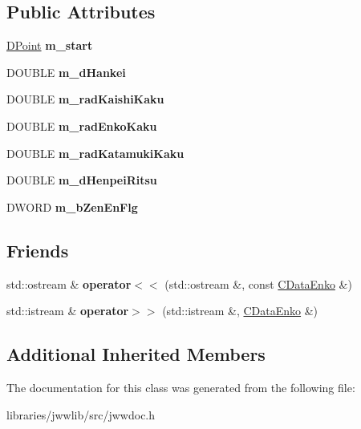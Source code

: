 \subsection*{Public Attributes}
\begin{DoxyCompactItemize}
\item 
\hypertarget{classCDataEnko_a9d4d16cc891a21c283fbfbe2a4830b1d}{\hyperlink{struct__DPoint}{D\-Point} {\bfseries m\-\_\-start}}\label{classCDataEnko_a9d4d16cc891a21c283fbfbe2a4830b1d}

\item 
\hypertarget{classCDataEnko_a9462f5d6a7f3be5f10230015dee146d6}{D\-O\-U\-B\-L\-E {\bfseries m\-\_\-d\-Hankei}}\label{classCDataEnko_a9462f5d6a7f3be5f10230015dee146d6}

\item 
\hypertarget{classCDataEnko_a2ab6fccfb035620f617380ee76594641}{D\-O\-U\-B\-L\-E {\bfseries m\-\_\-rad\-Kaishi\-Kaku}}\label{classCDataEnko_a2ab6fccfb035620f617380ee76594641}

\item 
\hypertarget{classCDataEnko_ac7ac6739e629edeb0e091a5115beabf6}{D\-O\-U\-B\-L\-E {\bfseries m\-\_\-rad\-Enko\-Kaku}}\label{classCDataEnko_ac7ac6739e629edeb0e091a5115beabf6}

\item 
\hypertarget{classCDataEnko_a2ea41b11b1244444f7596ff658325ecd}{D\-O\-U\-B\-L\-E {\bfseries m\-\_\-rad\-Katamuki\-Kaku}}\label{classCDataEnko_a2ea41b11b1244444f7596ff658325ecd}

\item 
\hypertarget{classCDataEnko_a595ed75d1da85a82ed0bf27f28cf0d9e}{D\-O\-U\-B\-L\-E {\bfseries m\-\_\-d\-Henpei\-Ritsu}}\label{classCDataEnko_a595ed75d1da85a82ed0bf27f28cf0d9e}

\item 
\hypertarget{classCDataEnko_a67f0b650f210b0bb4d4f1026b76c967f}{D\-W\-O\-R\-D {\bfseries m\-\_\-b\-Zen\-En\-Flg}}\label{classCDataEnko_a67f0b650f210b0bb4d4f1026b76c967f}

\end{DoxyCompactItemize}
\subsection*{Friends}
\begin{DoxyCompactItemize}
\item 
\hypertarget{classCDataEnko_ae32759a8e2e277725b5ec8963da9ce8d}{std\-::ostream \& {\bfseries operator$<$$<$} (std\-::ostream \&, const \hyperlink{classCDataEnko}{C\-Data\-Enko} \&)}\label{classCDataEnko_ae32759a8e2e277725b5ec8963da9ce8d}

\item 
\hypertarget{classCDataEnko_accc369e3296485fd2f28b2577a033f3a}{std\-::istream \& {\bfseries operator$>$$>$} (std\-::istream \&, \hyperlink{classCDataEnko}{C\-Data\-Enko} \&)}\label{classCDataEnko_accc369e3296485fd2f28b2577a033f3a}

\end{DoxyCompactItemize}
\subsection*{Additional Inherited Members}


The documentation for this class was generated from the following file\-:\begin{DoxyCompactItemize}
\item 
libraries/jwwlib/src/jwwdoc.\-h\end{DoxyCompactItemize}
